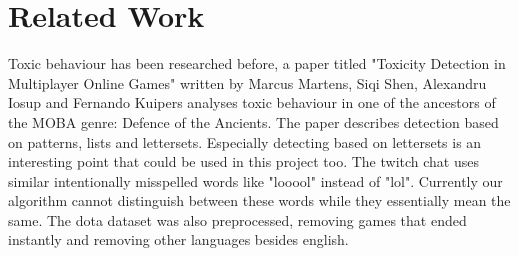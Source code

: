 \documentclass[final]{report}
\begin{document}
\chapter{Related Work}
\label{ch:relatedwork}

Toxic behaviour has been researched before, a paper titled "Toxicity Detection in Multiplayer Online Games" written by Marcus Martens, Siqi Shen, Alexandru Iosup and Fernando Kuipers analyses toxic behaviour in one of the ancestors of the MOBA genre: Defence of the Ancients. The paper describes detection based on patterns, lists and lettersets. Especially detecting based on lettersets is an interesting point that could be used in this project too. The twitch chat uses similar intentionally misspelled words like "looool" instead of "lol". Currently our algorithm cannot distinguish between these words while they essentially mean the same. The dota dataset was also preprocessed, removing games that ended instantly and removing other languages besides english.
\end{document}
